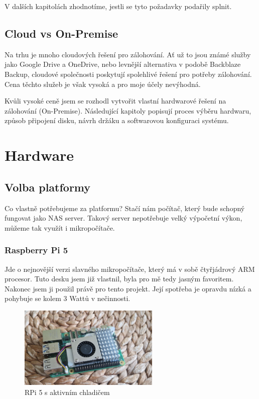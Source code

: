 \documentclass[a4paper,12pt, oneside]{book}
\begin{document}
V dalších kapitolách zhodnotíme, jestli se tyto
požadavky podařily splnit.


\section{Cloud vs On-Premise}

Na trhu je mnoho cloudových řešení pro zálohování. Ať už to jsou známé služby
jako Google Drive a OneDrive, nebo levnější alternativa v podobě Back\-blaze
Backup, cloudové společnosti poskytují spolehlivé řešení pro potřeby zálohování.
Cena těchto služeb je však vysoká a pro moje účely nevýhodná. 

Kvůli vysoké ceně jsem se rozhodl vytvořit vlastní hardwarové řešení na
zálohování (On-Premise).
Následující kapitoly popisují
proces výběru hardwaru, způsob připojení disku, návrh držáku a softwarovou
konfiguraci systému. 


\chapter{Hardware}
\section{Volba platformy}

Co vlastně potřebujeme za platformu? Stačí nám počítač, který bude 
schopný fungovat jako NAS server. Takový server nepotřebuje velký
výpočetní výkon, můžeme tak využít i mikropočítače. 


\subsection{Raspberry Pi 5}

Jde o nejnovější verzi slavného mikropočítače, který má v sobě čtyřjádrový ARM
procesor. Tuto desku jsem již vlastnil, byla pro mě tedy jasným favoritem.
Nakonec jsem ji použil právě pro tento projekt. Její spotřeba je opravdu nízká
a pohybuje se kolem 3 Wattů v nečinnosti.  \cite{RPi-Power}

\begin{figure}[h]
	\centering
	\includegraphics[width=0.6\textwidth]{img/rpi5-active-cooler-c.jpg}
	\caption{RPi 5 s aktivním chladičem}
\end{figure}
\end{document}
